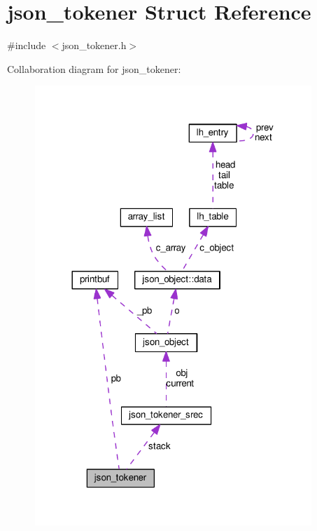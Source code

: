 \hypertarget{structjson__tokener}{}\section{json\+\_\+tokener Struct Reference}
\label{structjson__tokener}


{\ttfamily \#include $<$json\+\_\+tokener.\+h$>$}



Collaboration diagram for json\+\_\+tokener\+:
\nopagebreak
\begin{figure}[H]
\begin{center}
\leavevmode
\includegraphics[width=296pt]{structjson__tokener__coll__graph}
\end{center}
\end{figure}
